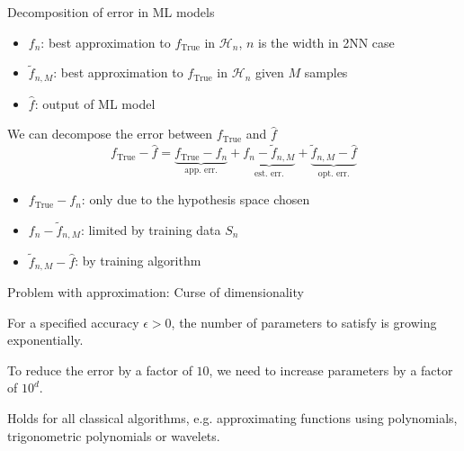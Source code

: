 \documentclass[aspectratio=32]{beamer}
\begin{document}
\begin{frame}{Decomposition of error in ML models}


    \begin{itemize}
        \item $f_n$: best approximation to $f_{\text{True}}$ in $\mathcal{H}_{n}$, $n$ is the width in 2NN case
        \item $\tilde{f}_{n, M}$: best approximation to $f_{\text{True}}$ in $\mathcal{H}_{n}$ 
            given $M$ samples
        \item $\hat{f}$: output of ML model
    \end{itemize}

    We can decompose the error between $f_{\text{True}}$ and $\hat{f}$
    \begin{equation*}
        f_{\text{True}} - \hat{f} 
        = \underbrace{f_{\text{True}} - f_n}_\text{app. err.}
        + \underbrace{f_n - \tilde{f}_{n, M}}_\text{est. err.}
        + \underbrace{\tilde{f}_{n, M} - \hat{f}}_\text{opt. err.}
    \end{equation*}

    \begin{itemize}
        \item $f_{\text{True}} - f_n$: only due to the hypothesis space chosen
        \item $f_n - \tilde{f}_{n, M}$: limited by training data $S_n$
        \item $\tilde{f}_{n, M} - \hat{f}$: by training algorithm
    \end{itemize}

\end{frame}

\begin{frame}{Problem with approximation: Curse of dimensionality}

    \begin{definition}[CoD]
        For a specified accuracy $\epsilon > 0$, the number of parameters to
        satisfy is growing exponentially.
    \end{definition}

    \vspace*{3em}


    To reduce the error by a factor of $10$, we need to increase parameters by a factor of $10^d$.

    Holds for all classical algorithms, e.g. approximating functions using
    polynomials, trigonometric polynomials or wavelets.

\end{frame}
\end{document}

